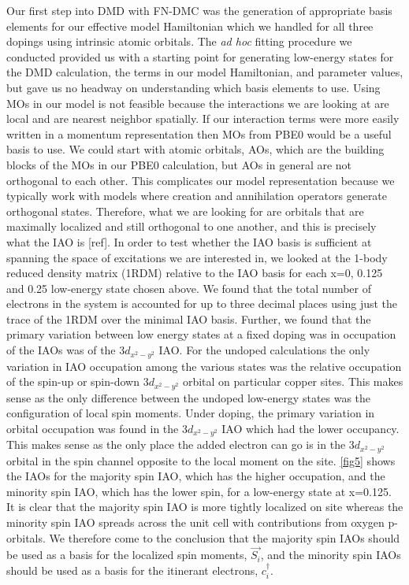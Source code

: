 \documentclass{article}
\begin{document}
Our first step into DMD with FN-DMC was the generation of appropriate basis elements for our effective model Hamiltonian which we handled for all three dopings using intrinsic atomic orbitals. 
The \textit{ad hoc} fitting procedure we conducted provided us with a starting point for generating low-energy states for the DMD calculation, the terms in our model Hamiltonian, and parameter values, but gave us no headway on understanding which basis elements to use.
Using MOs in our model is not feasible because the interactions we are looking at are local and are nearest neighbor spatially. 
If our interaction terms were more easily written in a momentum representation then MOs from PBE0 would be a useful basis to use. 
We could start with atomic orbitals, AOs, which are the building blocks of the MOs in our PBE0 calculation, but AOs in general are not orthogonal to each other. 
This complicates our model representation because we typically work with models where creation and annihilation operators generate orthogonal states. 
Therefore, what we are looking for are orbitals that are maximally localized and still orthogonal to one another, and this is precisely what the IAO is [ref]. 
In order to test whether the IAO basis is sufficient at spanning the space of excitations we are interested in, we looked at the 1-body reduced density matrix (1RDM) relative to the IAO basis for each x=0, 0.125 and 0.25 low-energy state chosen above. 
We found that the total number of electrons in the system is accounted for up to three decimal places using just the trace of the 1RDM over the minimal IAO basis. 
Further, we found that the primary variation between low energy states at a fixed doping was in occupation of the IAOs was of the 3$d_{x^2-y^2}$ IAO. 
For the undoped calculations the only variation in IAO occupation among the various states was the relative occupation of the spin-up or spin-down 3$d_{x^2-y^2}$ orbital on particular copper sites. 
This makes sense as the only difference between the undoped low-energy states was the configuration of local spin moments. 
Under doping, the primary variation in orbital occupation was found in the 3$d_{x^2-y^2}$ IAO which had the lower occupancy.
This makes sense as the only place the added electron can go is in the 3$d_{x^2-y^2}$ orbital in the spin channel opposite to the local moment on the site. 
\ref{fig5} shows the IAOs for the majority spin IAO, which has the higher occupation, and the minority spin IAO, which has the lower spin, for a low-energy state at x=0.125. 
It is clear that the majority spin IAO is more tightly localized on site whereas the minority spin IAO spreads across the unit cell with contributions from oxygen p-orbitals. 
We therefore come to the conclusion that the majority spin IAOs should be used as a basis for the localized spin moments, $\vec{S_i}$, and the minority spin IAOs should be used as a basis for the itinerant electrons, $c_i^\dagger$. 
\end{document}
